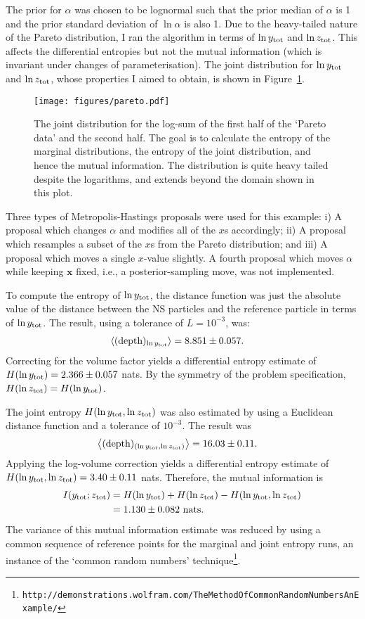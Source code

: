 \documentclass[entropy,article,accept,oneauthor,pdftex,10pt,a4paper]{mdpi}
\newcommand{\depth}{(\textnormal{depth})}
\newcommand{\ytot}{y_{\rm tot}}
\newcommand{\ztot}{z_{\rm tot}}
\begin{document}
The prior for $\alpha$ was chosen to be lognormal such that the prior median
of $\alpha$ is 1 and the prior standard deviation of $\ln \alpha$ is also 1.
Due to the heavy-tailed nature of the Pareto distribution, I ran the
algorithm in terms of $\ln \ytot$ and $\ln \ztot$. This affects the
differential entropies but not the mutual information (which is invariant 
under changes of parameterisation).
The joint distribution
for $\ln \ytot$ and $\ln \ztot$, whose properties I aimed to obtain,
is shown in Figure~\ref{fig:pareto}.

\begin{figure}[!ht]
\centering
\texttt{[image: figures/pareto.pdf]}
\caption{The joint distribution for the log-sum of the first half of the
`Pareto data' and the second half. The goal is to calculate the entropy of
the marginal distributions, the entropy of the joint distribution, and
hence the mutual information. The distribution is quite heavy tailed despite
the logarithms, and extends beyond the domain shown in this plot.
\label{fig:pareto}}
\end{figure}

Three types of Metropolis-Hastings proposals were used for this example:
i) A proposal which changes $\alpha$ and modifies all of the $x$s accordingly;
ii) A proposal which resamples a subset of the $x$s from the Pareto
distribution; and iii) A proposal which moves a single $x$-value slightly.
A fourth proposal which moves $\alpha$ while keeping $\boldsymbol{x}$ fixed,
i.e., a posterior-sampling move, was not implemented.

To compute the entropy of $\ln \ytot$, the distance function was just the
absolute value of the distance between the NS particles and the
reference particle in terms of $\ln \ytot$. The result, using a tolerance
of $L = 10^{-3}$, was:
\begin{align}
\left<\depth_{\ln \ytot}\right> &= 8.851 \pm 0.057.
\end{align}
Correcting for the volume factor yields a differential entropy estimate
of $H(\ln\ytot) = 2.366\pm 0.057$ nats.
By the symmetry of the problem specification, $H(\ln\ztot) = H(\ln\ytot)$.

The joint entropy $H(\ln \ytot, \ln \ztot)$ was also estimated by using
a Euclidean distance function and a tolerance of $10^{-3}$. The result was
\begin{align}
\left<\depth_{(\ln \ytot, \ln \ztot)}\right> &= 16.03 \pm 0.11.
\end{align}
Applying the log-volume correction yields a differential entropy estimate of
$H(\ln \ytot, \ln \ztot) = 3.40 \pm 0.11$ nats.
Therefore, the mutual information is
\begin{align}
I(\ytot; \ztot) &= H(\ln\ytot) + H(\ln\ztot) - H(\ln\ytot, \ln\ztot)\\
                &= 1.130 \pm 0.082 \textnormal{ nats}.
\end{align}
The variance of this mutual information estimate was reduced by
using a common sequence of reference points for the marginal and joint entropy
runs, an instance of the `common random numbers'
technique\footnote{\tt http://demonstrations.wolfram.com/TheMethodOfCommonRandomNumbersAnExample/}.
\end{document}
